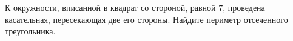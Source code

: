\begin{ex}
	\begin{condition}
		К окружности, вписанной в квадрат со стороной, равной \( 7 \), проведена касательная, пересекающая две его стороны. Найдите периметр отсеченного треугольника.
	\end{condition}
\end{ex}